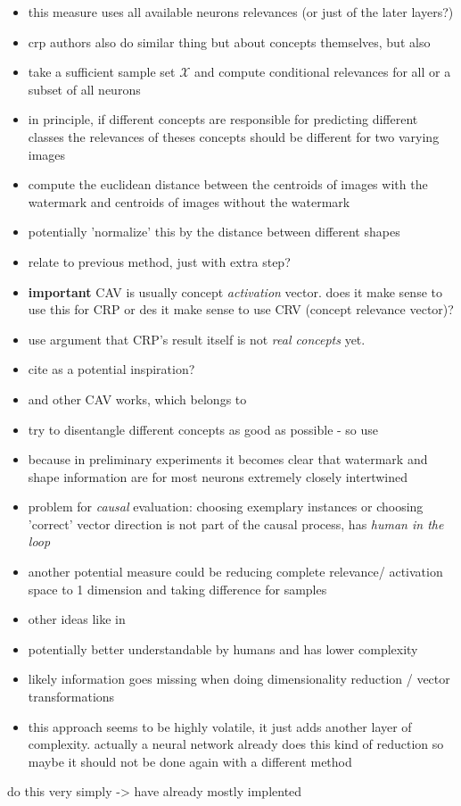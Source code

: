 \begin{itemize}
    \item this measure uses all available neurons relevances (or just of the later layers?)
    \item crp authors also do similar thing but about concepts themselves, but also \cite{Vielhaben2022,Vielhaben2023}
    \item take a sufficient sample set $\mathcal{X}$ and compute conditional relevances for all or a subset of all neurons
    \item in principle, if different concepts are responsible for predicting different classes the relevances of theses concepts should be different for two varying images
    \item compute the euclidean distance between the centroids of images with the watermark and centroids of images without the watermark
    \item potentially 'normalize' this by the distance between different shapes
    \item relate to previous method, just with extra step?
    \item \textbf{important} CAV is usually concept \textit{activation} vector. does it make sense to use this for CRP or des it make sense to use CRV (concept relevance vector)?
    \item use argument that CRP's result itself is not \textit{real concepts} yet. 
    \item cite \cite{Dreyer2023a} as a potential inspiration?
    \item and other CAV works, which \cite{Kim2018} belongs to
    \item try to disentangle different concepts as good as possible - so use \cite{Leemann2023}
    \item because in preliminary experiments it becomes clear that watermark and shape information are for most neurons extremely closely intertwined
    \item problem for \textit{causal} evaluation: choosing exemplary instances or choosing 'correct' vector direction is not part of the causal process, has \textit{human in the loop}
    \item another potential measure could be reducing complete relevance/ activation space to 1 dimension and taking difference for samples
    \item other ideas like in \cite{Chormai2022,Leemann2023,Ghorbani2019,Zhang2021}
    \item potentially better understandable by humans and has lower complexity
    \item likely information goes missing when doing dimensionality reduction / vector transformations
    \item this approach seems to be highly volatile, it just adds another layer of complexity. actually a neural network already does this kind of reduction so maybe it should not be done again with a different method
\end{itemize}
do this very simply -> have already mostly implented

